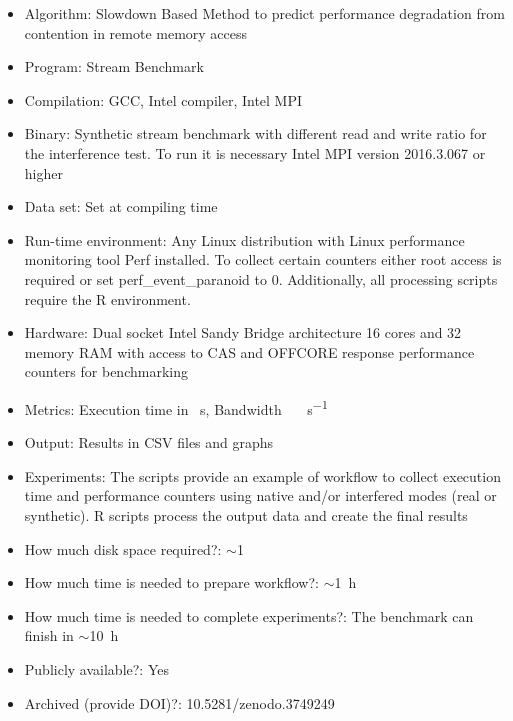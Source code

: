 \documentclass{sigplanconf}
\begin{document}
	\begin{itemize} 
		
		\item Algorithm: Slowdown Based Method to predict performance degradation from
		contention in remote memory access
		
		\item Program: Stream Benchmark
		
		\item Compilation: GCC, Intel compiler, Intel MPI 
		
		\item Binary: Synthetic stream benchmark with different read and write ratio for the
		interference test. To run it is necessary Intel MPI version 2016.3.067 or higher 
		
		\item Data set: Set at compiling time 
		
		\item Run-time environment: Any Linux distribution with Linux performance monitoring
		tool \textsf{Perf} installed. To collect certain counters either root access is
		required or set \textsf{perf\_event\_paranoid} to 0. Additionally, all processing
		scripts require the R environment.  
		
		\item Hardware: Dual socket Intel Sandy Bridge architecture 16 cores and
		\SI{32}{\giga\byte} memory RAM with access to CAS and OFFCORE response performance
		counters for benchmarking
		
		\item Metrics: Execution time in \SI{}{\second}, Bandwidth
		\SI{}{\giga\byte\per\second}
		
		\item Output: Results in CSV files and graphs 
		
		\item Experiments: The scripts provide an example of workflow to collect execution
		time and performance counters using native and/or interfered modes (real or
		synthetic). R scripts process the output data and create the final results 
		
		\item How much disk space required?: $\sim$\SI{1}{\giga\byte} 
		
		\item How much time is needed to prepare workflow?: $\sim$\SI{1}{\hour}
		
		\item How much time is needed to complete experiments?: The benchmark can finish in
		$\sim$\SI{10}{\hour}
		
		\item Publicly available?: Yes
		
		\item Archived (provide DOI)?: 10.5281/zenodo.3749249
		
	\end{itemize}
	
\end{document}
